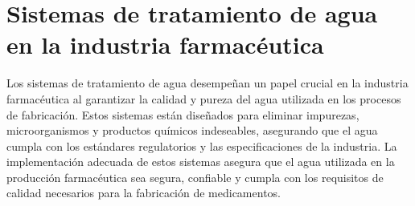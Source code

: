 \section{Sistemas de tratamiento de agua en la industria farmacéutica}
Los sistemas de tratamiento de agua desempeñan un papel crucial en la industria farmacéutica al 
garantizar la calidad y pureza del agua utilizada en los procesos de fabricación. 
Estos sistemas están diseñados para eliminar impurezas, microorganismos y productos 
químicos indeseables, asegurando que el agua cumpla con los estándares regulatorios
 y las especificaciones de la industria. La implementación adecuada de estos sistemas asegura 
 que el agua utilizada 
en la producción farmacéutica sea segura, confiable y cumpla con los
 requisitos de calidad necesarios para la fabricación de medicamentos.







% 
